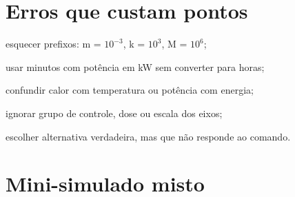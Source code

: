 \documentclass{notaaula}
\begin{document}
\section{Erros que custam pontos}

\begin{dica}
\begin{itens}
\item esquecer prefixos: m = $10^{-3}$, k = $10^3$, M = $10^6$;
\item usar minutos com potência em kW sem converter para horas;
\item confundir calor com temperatura ou potência com energia;
\item ignorar grupo de controle, dose ou escala dos eixos;
\item escolher alternativa verdadeira, mas que não responde ao comando.
\end{itens}
\end{dica}

\section{Mini-simulado misto}
\end{document}
